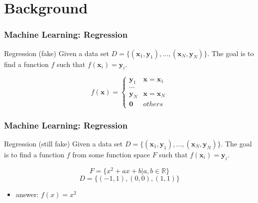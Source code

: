 \documentclass{beamer}
\begin{document}

\section{Background}

\begin{frame}
    \frametitle{Machine Learning: Regression}

    \begin{block}{Regression (fake)}
        Given a data set $D = \{(\boldsymbol{x}_1, \boldsymbol{y}_1), \dots, (\boldsymbol{x}_N, \boldsymbol{y}_N)\}$. The goal is to find a function $f$ such that $f(\boldsymbol{x}_i) = \boldsymbol{y}_i$.
    \end{block}
    \begin{solution}
        \[f(\boldsymbol{x}) = \begin{cases}
            \boldsymbol{y}_1 & \boldsymbol{x} = \boldsymbol{x}_1 \\
            \cdots & \\
            \boldsymbol{y}_N & \boldsymbol{x} = \boldsymbol{x}_N \\
            \boldsymbol{0} & others
        \end{cases}\]
    \end{solution}

\end{frame}

\begin{frame}
    \frametitle{Machine Learning: Regression}

    \begin{block}{Regression (still fake)}
        Given a data set $D = \{(\boldsymbol{x}_1, \boldsymbol{y}_1), \dots, (\boldsymbol{x}_N, \boldsymbol{y}_N)\}$. The goal is to find a function $f$ from some function space $F$ such that $f(\boldsymbol{x}_i) = \boldsymbol{y}_i$.
    \end{block}
    \begin{example}
        \[F = \{x^2 + ax + b \vert a, b \in \mathbb{R}\}\]
        \[D = \{(-1, 1), (0, 0), (1, 1)\}\]
        \begin{itemize}
            \item answer: $f(x) = x^2$
        \end{itemize}
    \end{example}

\end{frame}
\end{document}
